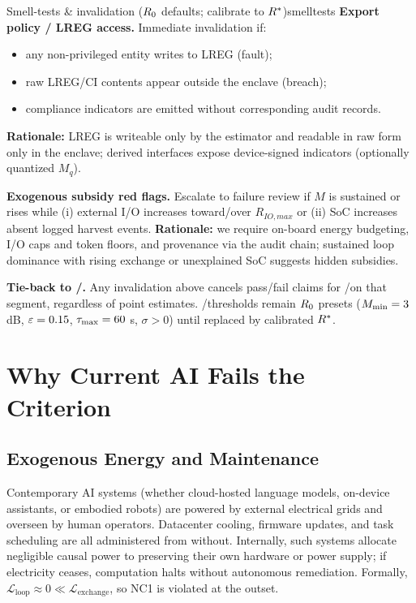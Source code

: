 \documentclass[11pt]{article}
\begin{document}
\begin{docbox}{Smell-tests \& invalidation ($R_0$ defaults; calibrate to $R^*$)}{smelltests}
\textbf{Export policy / LREG access.} Immediate invalidation if:
\begin{itemize}
\item any non-privileged entity writes to LREG (fault);
\item raw LREG/CI contents appear outside the enclave (breach);
\item compliance indicators are emitted without corresponding audit records.
\end{itemize}
\textbf{Rationale:} LREG is writeable only by the estimator and readable in raw form only in the enclave; derived interfaces expose device-signed indicators (optionally quantized $M_q$).

\textbf{Exogenous subsidy red flags.} Escalate to failure review if $M$ is sustained or rises while (i) external I/O increases toward/over $R_{IO,max}$ or (ii) SoC increases absent logged harvest events.
\textbf{Rationale:} we require on-board energy budgeting, I/O caps and token floors, and provenance via the audit chain; sustained loop dominance with rising exchange or unexplained SoC suggests hidden subsidies.

\textbf{Tie-back to \NC/\SC.} Any invalidation above cancels pass/fail claims for \NC/\SC on that segment, regardless of point estimates. \NC/\SC thresholds remain $R_0$ presets ($M_{\min} = 3$ dB, $\varepsilon = 0.15$, $\tau_{\max} = 60$ s, $\sigma > 0$) until replaced by calibrated $R^*$.
\end{docbox}

\section{Why Current AI Fails the Criterion}
\label{sec:ai_fails}
\subsection{Exogenous Energy and Maintenance}

Contemporary AI systems (whether cloud-hosted language models, on-device assistants, or embodied robots) are powered by external electrical grids and overseen by human operators. Datacenter cooling, firmware updates, and task scheduling are all administered from without. Internally, such systems allocate negligible causal power to preserving their own hardware or power supply; if electricity ceases, computation halts without autonomous remediation. Formally,
$\mathcal{L}_{\text{loop}} \approx 0 \ll \mathcal{L}_{\text{exchange}}$,
so NC1 is violated at the outset.
\end{document}
